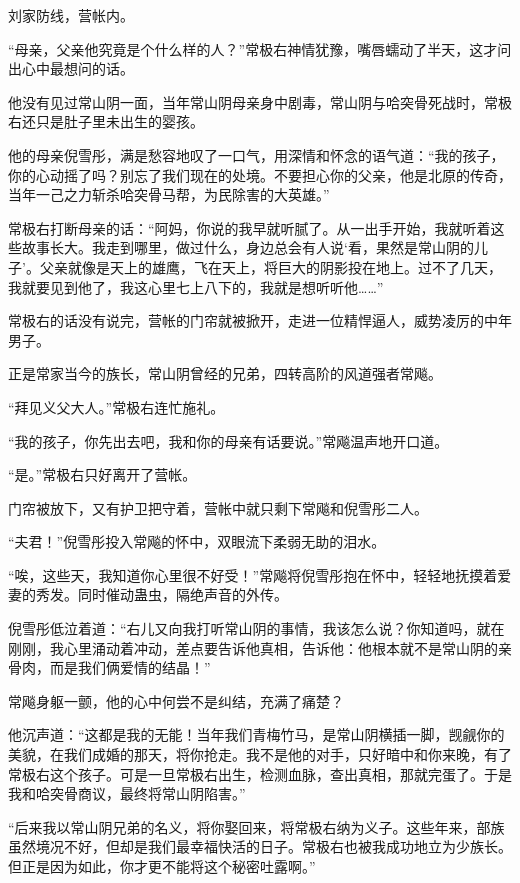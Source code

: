 
\begin{this_body}



刘家防线，营帐内。

“母亲，父亲他究竟是个什么样的人？”常极右神情犹豫，嘴唇蠕动了半天，这才问出心中最想问的话。

他没有见过常山阴一面，当年常山阴母亲身中剧毒，常山阴与哈突骨死战时，常极右还只是肚子里未出生的婴孩。

他的母亲倪雪彤，满是愁容地叹了一口气，用深情和怀念的语气道：“我的孩子，你的心动摇了吗？别忘了我们现在的处境。不要担心你的父亲，他是北原的传奇，当年一己之力斩杀哈突骨马帮，为民除害的大英雄。”

常极右打断母亲的话：“阿妈，你说的我早就听腻了。从一出手开始，我就听着这些故事长大。我走到哪里，做过什么，身边总会有人说‘看，果然是常山阴的儿子’。父亲就像是天上的雄鹰，飞在天上，将巨大的阴影投在地上。过不了几天，我就要见到他了，我这心里七上八下的，我就是想听听他……”

常极右的话没有说完，营帐的门帘就被掀开，走进一位精悍逼人，威势凌厉的中年男子。

正是常家当今的族长，常山阴曾经的兄弟，四转高阶的风道强者常飚。

“拜见义父大人。”常极右连忙施礼。

“我的孩子，你先出去吧，我和你的母亲有话要说。”常飚温声地开口道。

“是。”常极右只好离开了营帐。

门帘被放下，又有护卫把守着，营帐中就只剩下常飚和倪雪彤二人。

“夫君！”倪雪彤投入常飚的怀中，双眼流下柔弱无助的泪水。

“唉，这些天，我知道你心里很不好受！”常飚将倪雪彤抱在怀中，轻轻地抚摸着爱妻的秀发。同时催动蛊虫，隔绝声音的外传。

倪雪彤低泣着道：“右儿又向我打听常山阴的事情，我该怎么说？你知道吗，就在刚刚，我心里涌动着冲动，差点要告诉他真相，告诉他：他根本就不是常山阴的亲骨肉，而是我们俩爱情的结晶！”

常飚身躯一颤，他的心中何尝不是纠结，充满了痛楚？

他沉声道：“这都是我的无能！当年我们青梅竹马，是常山阴横插一脚，觊觎你的美貌，在我们成婚的那天，将你抢走。我不是他的对手，只好暗中和你来晚，有了常极右这个孩子。可是一旦常极右出生，检测血脉，查出真相，那就完蛋了。于是我和哈突骨商议，最终将常山阴陷害。”

“后来我以常山阴兄弟的名义，将你娶回来，将常极右纳为义子。这些年来，部族虽然境况不好，但却是我们最幸福快活的日子。常极右也被我成功地立为少族长。但正是因为如此，你才更不能将这个秘密吐露啊。”


\end{this_body}
